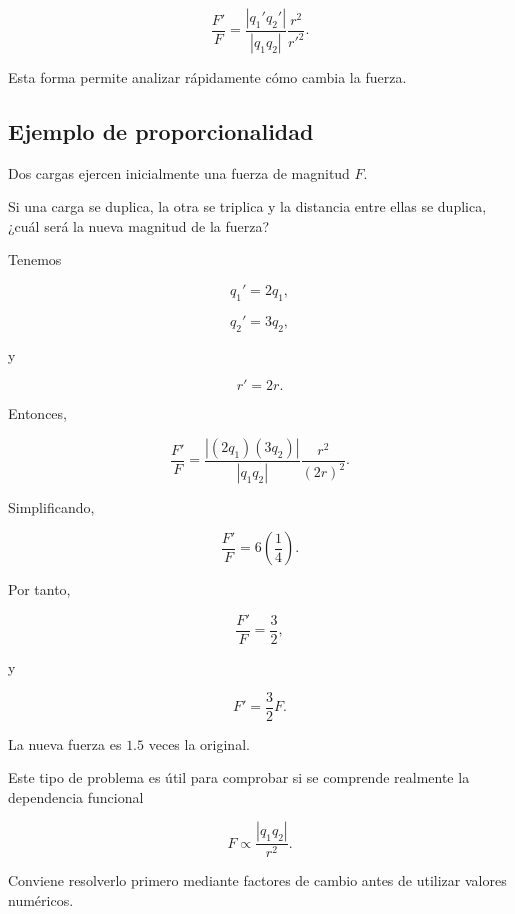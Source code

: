\begin{equation}
    \boxed{
    \frac{F'}{F}
    =
    \frac{|q_1'q_2'|}{|q_1q_2|}
    \frac{r^2}{r'^2}
    }.
    \label{eq:razon_coulomb}
\end{equation}

Esta forma permite analizar rápidamente cómo cambia la fuerza.



\subsection{Ejemplo de proporcionalidad}

\begin{ejemplo}

Dos cargas ejercen inicialmente una fuerza de magnitud \(F\).

Si una carga se duplica, la otra se triplica y la distancia entre ellas se
duplica, ¿cuál será la nueva magnitud de la fuerza?

\end{ejemplo}

Tenemos

\[
q_1'=2q_1,
\]

\[
q_2'=3q_2,
\]

y

\[
r'=2r.
\]

Entonces,

\[
\frac{F'}{F}
=
\frac{|(2q_1)(3q_2)|}{|q_1q_2|}
\frac{r^2}{(2r)^2}.
\]

Simplificando,

\[
\frac{F'}{F}
=
6\left(\frac{1}{4}\right).
\]

Por tanto,

\[
\frac{F'}{F}
=
\frac{3}{2},
\]

y

\[
\boxed{
F'=\frac{3}{2}F
}.
\]

La nueva fuerza es \(1.5\) veces la original.

\begin{notapedagogica}

Este tipo de problema es útil para comprobar si se comprende realmente la
dependencia funcional

\[
F\propto\frac{|q_1q_2|}{r^2}.
\]

Conviene resolverlo primero mediante factores de cambio antes de utilizar
valores numéricos.

\end{notapedagogica}


